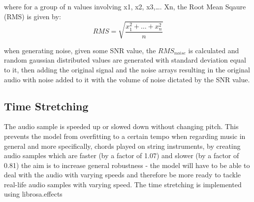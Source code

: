 \documentclass[a4paper]{article}
\begin{document}
\noindent where for a group of n values involving {x1, x2, x3,…. Xn}, the Root Mean Sqaure (RMS) is given by:
\begin{equation}
RMS = \sqrt{\frac{x_1^2 + \dots + x_n^2}{n}}
\label{eqn:rms}
\end{equation}

\noindent when generating noise, given some SNR value, the $RMS_{noise}$ is calculated and random gaussian distributed values are generated with standard deviation equal to it, then adding the original signal and the noise arrays resulting in the original audio with noise added to it with the volume of noise dictated by the SNR value.

\subsection{Time Stretching} \label{ssec:time}
The audio sample is speeded up or slowed down without changing pitch. This prevents the model from overfitting to a certain tempo when regarding music in general and more specifically, chords played on string instruments, by creating audio samples which are faster (by a factor of 1.07) and slower (by a factor of 0.81) the aim is to increase general robustness - the model will have to be able to deal with the audio with varying speeds and therefore be more ready to tackle real-life audio samples with varying speed.
The time stretching is implemented using librosa.effects






\end{document}
